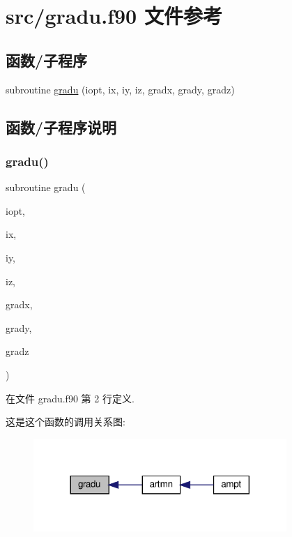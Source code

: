 \hypertarget{gradu_8f90}{}\section{src/gradu.f90 文件参考}
\label{gradu_8f90}
\subsection*{函数/子程序}
\begin{DoxyCompactItemize}
\item 
subroutine \mbox{\hyperlink{gradu_8f90_a03d61ed61003553fcd4b2f82f8ae719a}{gradu}} (iopt, ix, iy, iz, gradx, grady, gradz)
\end{DoxyCompactItemize}


\subsection{函数/子程序说明}
\mbox{\label{gradu_8f90_a03d61ed61003553fcd4b2f82f8ae719a}} 
\subsubsection{\texorpdfstring{gradu()}{gradu()}}
{\footnotesize\ttfamily subroutine gradu (\begin{DoxyParamCaption}\item[{}]{iopt,  }\item[{}]{ix,  }\item[{}]{iy,  }\item[{}]{iz,  }\item[{}]{gradx,  }\item[{}]{grady,  }\item[{}]{gradz }\end{DoxyParamCaption})}



在文件 gradu.\+f90 第 2 行定义.

这是这个函数的调用关系图\+:
\nopagebreak
\begin{figure}[H]
\begin{center}
\leavevmode
\includegraphics[width=272pt]{gradu_8f90_a03d61ed61003553fcd4b2f82f8ae719a_icgraph}
\end{center}
\end{figure}
